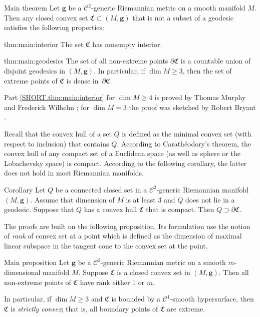 \documentclass[a4paper,10pt]{article}
\begin{document}
\begin{thm}{Main theorem}\label{thm:main}
Let $\bm{g}$ be a $\mathcal C^2$-generic Riemannian metric on a smooth manifold $M$.
Then any closed convex set $\mathfrak{C}\subset (M,\bm{g})$ that is not a subset of a geodesic
satisfies the following properties:

\begin{subthm}{thm:main:interior}
The set $\mathfrak{C}$ has nonempty interior.
\end{subthm}

\begin{subthm}{thm:main:geodesics}
The set of all non-extreme points $\partial\mathfrak{C}$ is a countable union of disjoint geodesics in $(M,\bm{g})$.
In particular, if $\dim M\ge 3$, then the set of
extreme points of $\mathfrak{C}$ is dense in~$\partial\mathfrak{C}$.
\end{subthm}

\end{thm}

Part \ref{SHORT.thm:main:interior} for $\dim M\ge 4$ is proved by Thomas Murphy and Frederick Wilhelm \cite{Wilhelm};
for $\dim M=3$ the proof was sketched by Robert Bryant \cite{Bryant}.

Recall that the convex hull of a set $Q$ is defined as the minimal convex set (with respect to inclusion) that contains $Q$.
According to Carathéodory's theorem, the convex hull of  any compact set of a Euclidean space (as well as sphere or the Lobachevsky space) is compact.
According to the following corollary, the latter does not hold in most Riemannian manifolds.

\begin{thm}{Corollary}\label{cor:caratheodory}
Let $Q$ be a connected closed set in a $\mathcal C^2$-generic Riemannian manifold $(M,\bm{g})$.
Assume that dimension of $M$ is at least $3$ and $Q$ does not lie in a geodesic.
Suppose that  $Q$ has a convex hull $\mathfrak{C}$ that is compact.
Then $Q\supset \partial \mathfrak{C}$.
\end{thm}

The proofs are built on the following proposition.
Its formulation use the notion of \emph{rank} of convex set at a point which is defined as the dimension of maximal linear subspace in the tangent cone to the convex set at the point.

\begin{thm}{Main proposition}\label{prom:rank}
Let $\bm{g}$ be a $\mathcal C^2$-generic Riemannian metric on a smooth $m$-dimensional manifold $M$.
Suppose $\mathfrak{C}$ is a closed convex set in $(M,\bm{g})$.
Then all non-extreme points of $\mathfrak{C}$ have rank either $1$ or $m$.

In particular, if $\dim M\ge 3$ and $\mathfrak{C}$ is bounded by a $\mathcal{C}^1$-smooth hypersurface, then $\mathfrak{C}$ is \emph{strictly convex};
that is, all boundary points of $\mathfrak{C}$ are extreme.
\end{thm}
\end{document}
